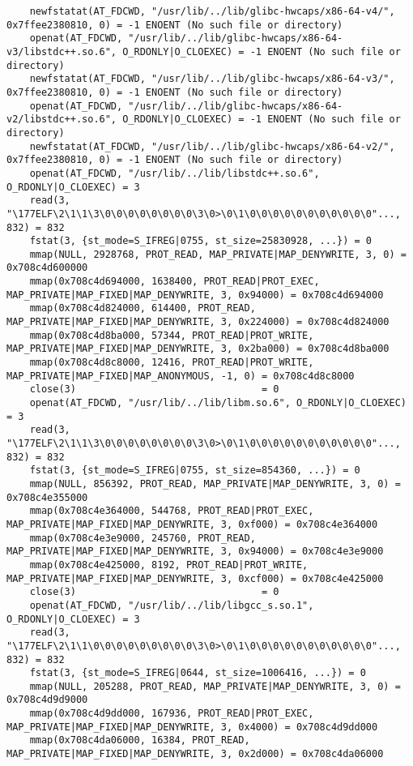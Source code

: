 \documentclass[12pt]{article}
\begin{document}
\begin{verbatim}
	newfstatat(AT_FDCWD, "/usr/lib/../lib/glibc-hwcaps/x86-64-v4/", 0x7ffee2380810, 0) = -1 ENOENT (No such file or directory)
	openat(AT_FDCWD, "/usr/lib/../lib/glibc-hwcaps/x86-64-v3/libstdc++.so.6", O_RDONLY|O_CLOEXEC) = -1 ENOENT (No such file or directory)
	newfstatat(AT_FDCWD, "/usr/lib/../lib/glibc-hwcaps/x86-64-v3/", 0x7ffee2380810, 0) = -1 ENOENT (No such file or directory)
	openat(AT_FDCWD, "/usr/lib/../lib/glibc-hwcaps/x86-64-v2/libstdc++.so.6", O_RDONLY|O_CLOEXEC) = -1 ENOENT (No such file or directory)
	newfstatat(AT_FDCWD, "/usr/lib/../lib/glibc-hwcaps/x86-64-v2/", 0x7ffee2380810, 0) = -1 ENOENT (No such file or directory)
	openat(AT_FDCWD, "/usr/lib/../lib/libstdc++.so.6", O_RDONLY|O_CLOEXEC) = 3
	read(3, "\177ELF\2\1\1\3\0\0\0\0\0\0\0\0\3\0>\0\1\0\0\0\0\0\0\0\0\0\0\0"..., 832) = 832
	fstat(3, {st_mode=S_IFREG|0755, st_size=25830928, ...}) = 0
	mmap(NULL, 2928768, PROT_READ, MAP_PRIVATE|MAP_DENYWRITE, 3, 0) = 0x708c4d600000
	mmap(0x708c4d694000, 1638400, PROT_READ|PROT_EXEC, MAP_PRIVATE|MAP_FIXED|MAP_DENYWRITE, 3, 0x94000) = 0x708c4d694000
	mmap(0x708c4d824000, 614400, PROT_READ, MAP_PRIVATE|MAP_FIXED|MAP_DENYWRITE, 3, 0x224000) = 0x708c4d824000
	mmap(0x708c4d8ba000, 57344, PROT_READ|PROT_WRITE, MAP_PRIVATE|MAP_FIXED|MAP_DENYWRITE, 3, 0x2ba000) = 0x708c4d8ba000
	mmap(0x708c4d8c8000, 12416, PROT_READ|PROT_WRITE, MAP_PRIVATE|MAP_FIXED|MAP_ANONYMOUS, -1, 0) = 0x708c4d8c8000
	close(3)                                = 0
	openat(AT_FDCWD, "/usr/lib/../lib/libm.so.6", O_RDONLY|O_CLOEXEC) = 3
	read(3, "\177ELF\2\1\1\3\0\0\0\0\0\0\0\0\3\0>\0\1\0\0\0\0\0\0\0\0\0\0\0"..., 832) = 832
	fstat(3, {st_mode=S_IFREG|0755, st_size=854360, ...}) = 0
	mmap(NULL, 856392, PROT_READ, MAP_PRIVATE|MAP_DENYWRITE, 3, 0) = 0x708c4e355000
	mmap(0x708c4e364000, 544768, PROT_READ|PROT_EXEC, MAP_PRIVATE|MAP_FIXED|MAP_DENYWRITE, 3, 0xf000) = 0x708c4e364000
	mmap(0x708c4e3e9000, 245760, PROT_READ, MAP_PRIVATE|MAP_FIXED|MAP_DENYWRITE, 3, 0x94000) = 0x708c4e3e9000
	mmap(0x708c4e425000, 8192, PROT_READ|PROT_WRITE, MAP_PRIVATE|MAP_FIXED|MAP_DENYWRITE, 3, 0xcf000) = 0x708c4e425000
	close(3)                                = 0
	openat(AT_FDCWD, "/usr/lib/../lib/libgcc_s.so.1", O_RDONLY|O_CLOEXEC) = 3
	read(3, "\177ELF\2\1\1\0\0\0\0\0\0\0\0\0\3\0>\0\1\0\0\0\0\0\0\0\0\0\0\0"..., 832) = 832
	fstat(3, {st_mode=S_IFREG|0644, st_size=1006416, ...}) = 0
	mmap(NULL, 205288, PROT_READ, MAP_PRIVATE|MAP_DENYWRITE, 3, 0) = 0x708c4d9d9000
	mmap(0x708c4d9dd000, 167936, PROT_READ|PROT_EXEC, MAP_PRIVATE|MAP_FIXED|MAP_DENYWRITE, 3, 0x4000) = 0x708c4d9dd000
	mmap(0x708c4da06000, 16384, PROT_READ, MAP_PRIVATE|MAP_FIXED|MAP_DENYWRITE, 3, 0x2d000) = 0x708c4da06000

\end{verbatim}
\end{document}
